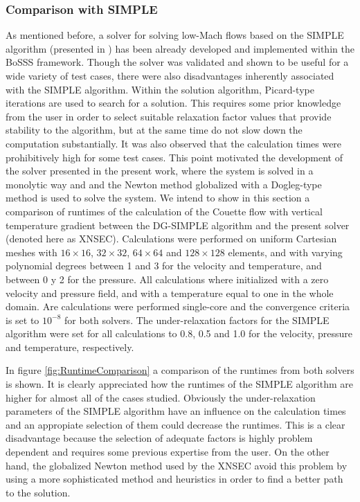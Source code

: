 \subsubsection{Comparison with SIMPLE}
As mentioned before, a solver for solving low-Mach flows based on the SIMPLE algorithm (presented in \cite{kleinHighorderDiscontinuousGalerkin2016}) has been already developed and implemented within the BoSSS framework.
Though the solver was validated and shown to be useful for a wide variety of test cases, there were also disadvantages inherently associated with the SIMPLE algorithm. Within the solution algorithm, Picard-type iterations are used to search for a solution. This requires some prior knowledge from the user in order to select suitable relaxation factor values that provide stability to the algorithm, but at the same time do not slow down the computation substantially.
It was also observed that the calculation times were prohibitively high for some test cases. This point motivated the development of the solver presented in the present work, where the system is solved in a monolytic way and  and the Newton method globalized with a Dogleg-type method is used to solve the system.
We intend to show in this section a comparison of runtimes of the calculation of the Couette flow with vertical temperature gradient between the DG-SIMPLE algorithm \citep{kleinHighorderDiscontinuousGalerkin2016} and the present solver (denoted here as XNSEC). Calculations were performed on uniform Cartesian meshes with $16\times16$, $32\times32$, $64\times64$ and $128\times128$ elements, and with varying polynomial degrees between 1 and 3 for the velocity and temperature, and between 0 y 2 for the pressure. All calculations where initialized with a zero velocity and pressure field, and with a temperature equal to one in the whole domain. Are calculations were performed single-core and the convergence criteria is set to $10^{-8}$ for both solvers. The under-relaxation factors for the SIMPLE algorithm were set for all calculations to 0.8, 0.5 and 1.0 for the velocity, pressure and temperature, respectively.

In figure \cref{fig:RuntimeComparison} a comparison of the runtimes from both solvers is shown. It is clearly  appreciated how the runtimes of the SIMPLE algorithm are higher for almost all of the cases studied. Obviously the under-relaxation parameters of the SIMPLE algorithm have an influence on the calculation times and an appropiate selection of them could decrease the runtimes. This is a clear disadvantage because the selection of adequate factors is highly problem dependent and requires some previous expertise from the user. On the other hand, the globalized Newton method used by the XNSEC avoid this problem by using a more sophisticated method and heuristics in order to find a better path to the solution.

